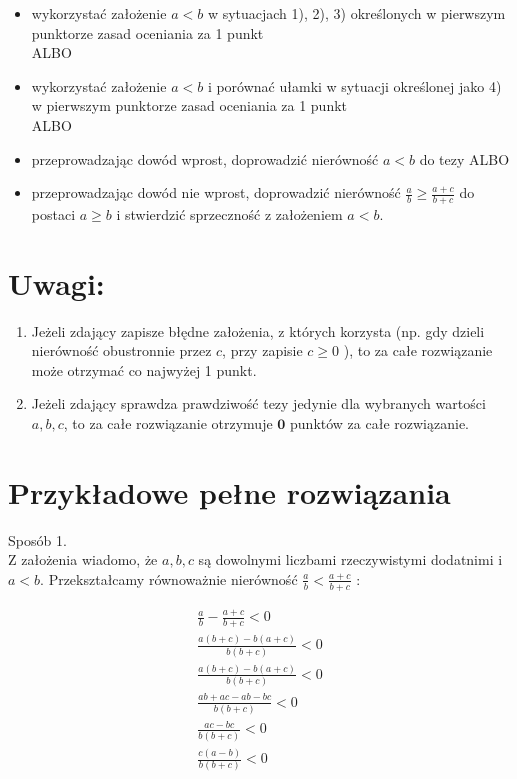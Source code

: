 \documentclass[10pt]{article}
\begin{document}
\begin{itemize}
  \item wykorzystać założenie $a<b$ w sytuacjach 1), 2), 3) określonych w pierwszym punktorze zasad oceniania za 1 punkt\\
ALBO
  \item wykorzystać założenie $a<b$ i porównać ułamki w sytuacji określonej jako 4) w pierwszym punktorze zasad oceniania za 1 punkt\\
ALBO
  \item przeprowadzając dowód wprost, doprowadzić nierówność $a<b$ do tezy ALBO
  \item przeprowadzając dowód nie wprost, doprowadzić nierówność $\frac{a}{b} \geq \frac{a+c}{b+c}$ do postaci $a \geq b$ i stwierdzić sprzeczność z założeniem $a<b$.
\end{itemize}

\section*{Uwagi:}
\begin{enumerate}
  \item Jeżeli zdający zapisze błędne założenia, z których korzysta (np. gdy dzieli nierówność obustronnie przez $c$, przy zapisie $c \geq 0$ ), to za całe rozwiązanie może otrzymać co najwyżej 1 punkt.
  \item Jeżeli zdający sprawdza prawdziwość tezy jedynie dla wybranych wartości $a, b, c$, to za całe rozwiązanie otrzymuje $\mathbf{0}$ punktów za całe rozwiązanie.
\end{enumerate}

\section*{Przykładowe pełne rozwiązania}
Sposób 1.\\
Z założenia wiadomo, że $a, b, c$ są dowolnymi liczbami rzeczywistymi dodatnimi i $a<b$. Przekształcamy równoważnie nierówność $\frac{a}{b}<\frac{a+c}{b+c}$ :

$$
\begin{gathered}
\frac{a}{b}-\frac{a+c}{b+c}<0 \\
\frac{a(b+c)-b(a+c)}{b(b+c)}<0 \\
\frac{a(b+c)-b(a+c)}{b(b+c)}<0 \\
\frac{a b+a c-a b-b c}{b(b+c)}<0 \\
\frac{a c-b c}{b(b+c)}<0 \\
\frac{c(a-b)}{b(b+c)}<0
\end{gathered}
$$
\end{document}
